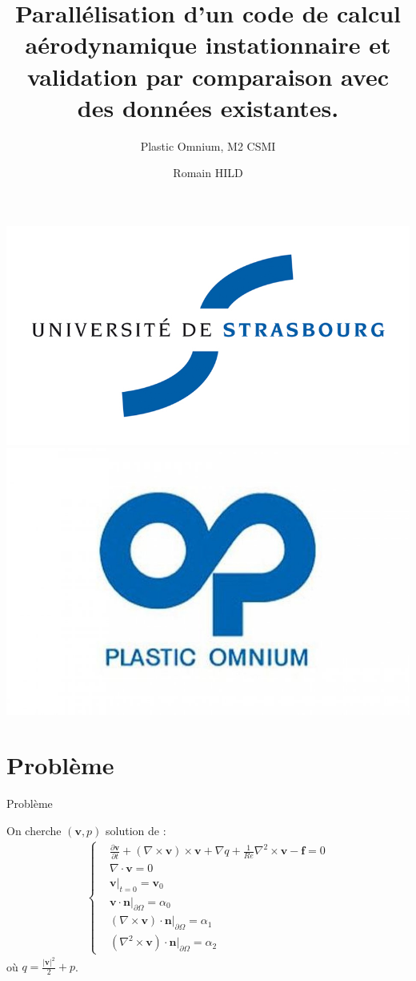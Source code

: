 \documentclass{beamer}
\title[Stage]{Parallélisation d'un code de calcul aérodynamique instationnaire et validation par comparaison avec des données existantes.}
\subtitle{Plastic Omnium, M2 CSMI}
\author{Romain HILD}
\institute{Université de Strasbourg}
\newcommand{\grad}{{\nabla}}
\newcommand{\rot}{{\nabla\times}}
\newcommand{\rott}{{\nabla^2\times}}
\renewcommand{\div}{{\nabla\cdot}}
\newcommand{\restr}{{\big\rvert_{\partial\Omega}}}
\begin{document}
\begin{frame}
\includegraphics[scale=0.2]{uds.jpg}\includegraphics[scale=0.15]{po.jpg}
\titlepage
\end{frame}

\section{Problème}
\begin{frame}{Problème}
\begin{block}{On cherche $(\mathbf{v},p)$ solution de :}
\begin{eqnarray}
\label{depart}
\left\{
\begin{aligned}
&\frac{\partial \mathbf{v}}{\partial t} + (\rot  \mathbf{v})\times \mathbf{v} + \grad q + \frac{1}{Re}\rott  \mathbf{v}-\mathbf{f} = 0\\
&\div \mathbf{v} = 0\\
&\mathbf{v}\big\rvert_{t=0} = \mathbf{v}_0\\
&\mathbf{v}\cdot \mathbf{n}\restr = \alpha_0\\
&(\rot  \mathbf{v})\cdot \mathbf{n}\restr = \alpha_1\\
&(\rott  \mathbf{v})\cdot \mathbf{n}\restr = \alpha_2
\end{aligned}
\right.
\end{eqnarray}
où $q = \frac{|\mathbf{v}|^2}{2}+p$.
\end{block}
\end{frame}
\end{document}
